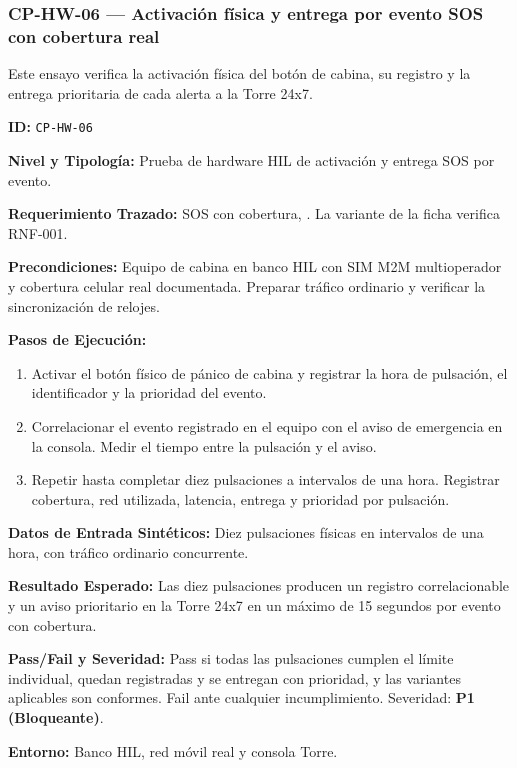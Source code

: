 \subsubsection*{CP-HW-06 — Activación física y entrega por evento SOS con cobertura real}\label{sec:9-cp-hw-06}
Este ensayo verifica la activación física del botón de cabina, su registro y la entrega prioritaria de cada alerta a la Torre 24x7.

\par\noindent\textbf{ID:} \texttt{CP-\allowbreak{}HW-\allowbreak{}06}\par
\par\noindent\textbf{Nivel y Tipología:} Prueba de hardware HIL de activación y entrega SOS por evento.\par
\par\noindent\textbf{Requerimiento Trazado:} SOS con cobertura, . La variante de la ficha verifica RNF-001.\par
\par\noindent\textbf{Precondiciones:} Equipo de cabina en banco HIL con SIM M2M multioperador y cobertura celular real documentada. Preparar tráfico ordinario y verificar la sincronización de relojes.\par
\par\noindent\textbf{Pasos de Ejecución:}\par
\begin{enumerate}
\item Activar el botón físico de pánico de cabina y registrar la hora de pulsación, el identificador y la prioridad del evento.
\item Correlacionar el evento registrado en el equipo con el aviso de emergencia en la consola. Medir el tiempo entre la pulsación y el aviso.
\item Repetir hasta completar diez pulsaciones a intervalos de una hora. Registrar cobertura, red utilizada, latencia, entrega y prioridad por pulsación.
\end{enumerate}
\par\noindent\textbf{Datos de Entrada Sintéticos:} Diez pulsaciones físicas en intervalos de una hora, con tráfico ordinario concurrente.\par
\par\noindent\textbf{Resultado Esperado:} Las diez pulsaciones producen un registro correlacionable y un aviso prioritario en la Torre 24x7 en un máximo de 15 segundos por evento con cobertura.\par
\par\noindent\textbf{Pass/Fail y Severidad:} Pass si todas las pulsaciones cumplen el límite individual, quedan registradas y se entregan con prioridad, y las variantes aplicables son conformes. Fail ante cualquier incumplimiento. Severidad: \textbf{P1 (Bloqueante)}.\par
\par\noindent\textbf{Entorno:} Banco HIL, red móvil real y consola Torre.\par

